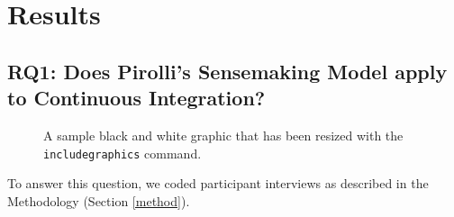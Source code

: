 \documentclass{sig-alternate}
\begin{document}
\section{Results}

\subsection{RQ1:  Does Pirolli's Sensemaking Model apply to Continuous Integration?}
\begin{figure}
\centering
{}
\caption{A sample black and white graphic
that has been resized with the \texttt{includegraphics} command.}
\end{figure}

To answer this question, we coded participant interviews as described in the Methodology (Section \ref{method}).
\end{document}
